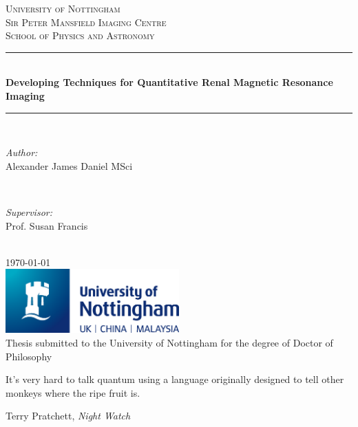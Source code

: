 \documentclass[12pt,a4paper,oneside]{report}
\author{Alexander James Daniel}
\newcommand\blankpage{
    \null
    \thispagestyle{empty}
    \addtocounter{page}{-1}
    \newpage}
\begin{document}
{
\begin{titlepage}
\newcommand{\HRule}{\rule{\linewidth}{0.5mm}}
\center
 
\textsc{\LARGE University of Nottingham}\\[0.5cm]
\textsc{\Large Sir Peter Mansfield Imaging Centre}\\[0.5cm]
\textsc{\large School of Physics and Astronomy}\\[0.5cm]

\HRule \\[0.4cm]
{ \Large \bfseries Developing Techniques for Quantitative Renal Magnetic Resonance Imaging}\\[0.2cm]
\HRule \\[1.5cm]

\begin{minipage}{0.4\textwidth}
\begin{flushleft} \large
\emph{Author:}\\
Alexander James Daniel MSci
\end{flushleft}
\end{minipage}
~
\begin{minipage}{0.4\textwidth}
\begin{flushright} \large
\emph{Supervisor:} \\
Prof. Susan Francis
\end{flushright}
\end{minipage}\\[4cm]
{\large \today}\\[2cm]

\includegraphics[width=0.5\textwidth]{UoN_Primary_Logo_CMYK.eps}\\[1cm]
Thesis submitted to the University of Nottingham for the degree of Doctor of Philosophy
\vfill
\end{titlepage}
}
\pagestyle{plain}

\vspace*{200px}

\epigraph{\large{It’s very hard to talk quantum using a language originally designed to tell other monkeys where the ripe fruit is.}}{\normalsize{Terry Pratchett, \textit{Night Watch}}}
\newpage
\end{document}

